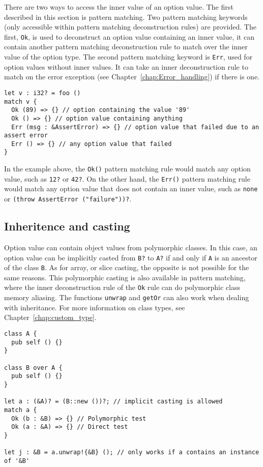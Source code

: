 There are two ways to access the inner value of an option value. The first
described in this section is pattern matching. Two pattern matching keywords
(only accessible within pattern matching deconstruction rules) are provided. The
first, \texttt{Ok}, is used to deconstruct an option value containing an inner
value, it can contain another pattern matching deconstruction rule to match over
the inner value of the option type. The second pattern matching keyword is
\texttt{Err}, used for option values without inner values. It can take an inner
deconstruction rule to match on the error exception (see
Chapter~\ref{chap:Error_handling}) if there is one.

\begin{lstlisting}[style=coloredverbatim]
let v : i32? = foo ()
match v {
  Ok (89) => {} // option containing the value '89'
  Ok () => {} // option value containing anything
  Err (msg : &AssertError) => {} // option value that failed due to an assert error
  Err () => {} // any option value that failed
}
\end{lstlisting}

In the example above, the \texttt{Ok()} pattern matching rule would match any
option value, such as \texttt{12?} or \texttt{42?}. On the other hand, the
\texttt{Err()} pattern matching rule would match any option value that does not
contain an inner value, such as \texttt{none} or \texttt{(throw AssertError
  ("failure"))?}.


\subsection{Inheritence and casting}

Option value can contain object values from polymorphic classes. In this case,
an option value can be implicitly casted from \texttt{B?} to \texttt{A?} if and
only if \texttt{A} is an ancestor of the class \texttt{B}. As for array, or
slice casting, the opposite is not possible for the same reasons. This
polymorphic casting is also available in pattern matching, where the inner
deconstruction rule of the \texttt{Ok} rule can do polymorphic class memory
aliasing. The functions \texttt{unwrap} and \texttt{getOr} can also work when
dealing with inheritance. For more information on class types, see
Chapter~\ref{chap:custom_type}.

\begin{lstlisting}[style=coloredverbatim]
class A {
  pub self () {}
}

class B over A {
  pub self () {}
}

let a : (&A)? = (B::new ())?; // implicit casting is allowed
match a {
  Ok (b : &B) => {} // Polymorphic test
  Ok (a : &A) => {} // Direct test
}

let j : &B = a.unwrap!{&B} (); // only works if a contains an instance of '&B'
\end{lstlisting}
